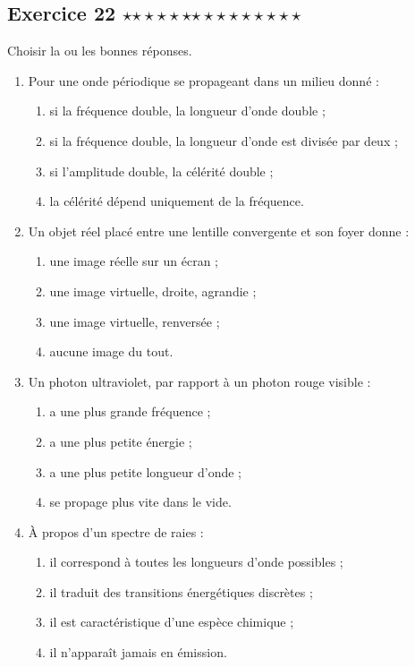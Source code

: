 \documentclass[11pt,a4paper]{article}
\newcommand{\etoiles}[1]{%
\ifcase#1\or $\star$\or $\star\star$\or $\star\star\star$\or $\star\star\star\star$\or $\star\star\star\star\star$\fi}
\newcommand{\exostar}[2]{\subsection*{Exercice #1 \hfill \etoiles{#2}}}
\begin{document}
\exostar{22}{3}
Choisir la ou les bonnes réponses.
\begin{enumerate}[label=\textbf{QCM \arabic*.},leftmargin=1.5cm]
    \item Pour une onde périodique se propageant dans un milieu donné :
    \begin{enumerate}[label=\alph*)]
        \item si la fréquence double, la longueur d'onde double ;
        \item si la fréquence double, la longueur d'onde est divisée par deux ;
        \item si l'amplitude double, la célérité double ;
        \item la célérité dépend uniquement de la fréquence.
    \end{enumerate}
    \item Un objet réel placé entre une lentille convergente et son foyer donne :
    \begin{enumerate}[label=\alph*)]
        \item une image réelle sur un écran ;
        \item une image virtuelle, droite, agrandie ;
        \item une image virtuelle, renversée ;
        \item aucune image du tout.
    \end{enumerate}
    \item Un photon ultraviolet, par rapport à un photon rouge visible :
    \begin{enumerate}[label=\alph*)]
        \item a une plus grande fréquence ;
        \item a une plus petite énergie ;
        \item a une plus petite longueur d'onde ;
        \item se propage plus vite dans le vide.
    \end{enumerate}
    \item À propos d'un spectre de raies :
    \begin{enumerate}[label=\alph*)]
        \item il correspond à toutes les longueurs d'onde possibles ;
        \item il traduit des transitions énergétiques discrètes ;
        \item il est caractéristique d'une espèce chimique ;
        \item il n'apparaît jamais en émission.
    \end{enumerate}
\end{enumerate}
\end{document}
